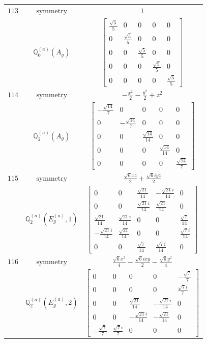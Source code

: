 \documentclass[fleqn,8pt,landscape]{jsarticle}
\begin{document}
\begin{longtable}{ccc}
$ 113 $ & $ \text{symmetry} $ & $ 1 $ \\
$  $ & $ \mathbb{Q}_{0}^{(a)}(A_{g}) $ & $ \begin{bmatrix} \frac{\sqrt{5}}{5} & 0 & 0 & 0 & 0 \\ 0 & \frac{\sqrt{5}}{5} & 0 & 0 & 0 \\ 0 & 0 & \frac{\sqrt{5}}{5} & 0 & 0 \\ 0 & 0 & 0 & \frac{\sqrt{5}}{5} & 0 \\ 0 & 0 & 0 & 0 & \frac{\sqrt{5}}{5} \end{bmatrix} $ \\ \hline
$ 114 $ & $ \text{symmetry} $ & $ - \frac{x^{2}}{2} - \frac{y^{2}}{2} + z^{2} $ \\
$  $ & $ \mathbb{Q}_{2}^{(a)}(A_{g}) $ & $ \begin{bmatrix} - \frac{\sqrt{14}}{7} & 0 & 0 & 0 & 0 \\ 0 & - \frac{\sqrt{14}}{7} & 0 & 0 & 0 \\ 0 & 0 & \frac{\sqrt{14}}{14} & 0 & 0 \\ 0 & 0 & 0 & \frac{\sqrt{14}}{14} & 0 \\ 0 & 0 & 0 & 0 & \frac{\sqrt{14}}{7} \end{bmatrix} $ \\ \hline
$ 115 $ & $ \text{symmetry} $ & $ \frac{\sqrt{6} x z}{2} + \frac{\sqrt{6} i y z}{2} $ \\
$  $ & $ \mathbb{Q}_{2}^{(a)}(E_{g}^{(a)},1) $ & $ \begin{bmatrix} 0 & 0 & \frac{\sqrt{21}}{14} & - \frac{\sqrt{21} i}{14} & 0 \\ 0 & 0 & \frac{\sqrt{21} i}{14} & \frac{\sqrt{21}}{14} & 0 \\ \frac{\sqrt{21}}{14} & \frac{\sqrt{21} i}{14} & 0 & 0 & \frac{\sqrt{7}}{14} \\ - \frac{\sqrt{21} i}{14} & \frac{\sqrt{21}}{14} & 0 & 0 & \frac{\sqrt{7} i}{14} \\ 0 & 0 & \frac{\sqrt{7}}{14} & \frac{\sqrt{7} i}{14} & 0 \end{bmatrix} $ \\ \hline
$ 116 $ & $ \text{symmetry} $ & $ \frac{\sqrt{6} x^{2}}{4} - \frac{\sqrt{6} i x y}{2} - \frac{\sqrt{6} y^{2}}{4} $ \\
$  $ & $ \mathbb{Q}_{2}^{(a)}(E_{g}^{(a)},2) $ & $ \begin{bmatrix} 0 & 0 & 0 & 0 & - \frac{\sqrt{7}}{7} \\ 0 & 0 & 0 & 0 & \frac{\sqrt{7} i}{7} \\ 0 & 0 & \frac{\sqrt{21}}{14} & - \frac{\sqrt{21} i}{14} & 0 \\ 0 & 0 & - \frac{\sqrt{21} i}{14} & - \frac{\sqrt{21}}{14} & 0 \\ - \frac{\sqrt{7}}{7} & \frac{\sqrt{7} i}{7} & 0 & 0 & 0 \end{bmatrix} $ \\ \hline

\end{longtable}
\end{document}
